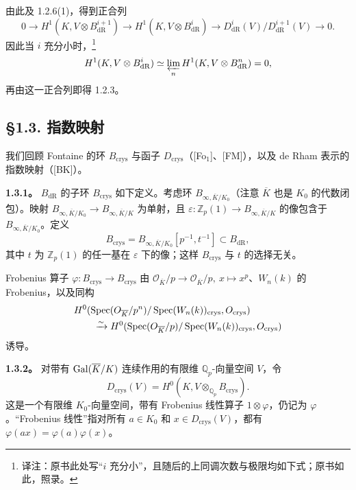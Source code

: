 由此及 1.2.6(1)，得到正合列
\[
 0\longrightarrow H^1(K,V\otimes B^{i+1}_{\mathrm{dR}})
 \longrightarrow H^1(K,V\otimes B^i_{\mathrm{dR}})
 \longrightarrow D^i_{\mathrm{dR}}(V)/D^{i+1}_{\mathrm{dR}}(V)\longrightarrow0.
\]
因此当 $i$ 充分小时，\footnote{译注：原书此处写“$i$ 充分小”，且随后的上同调次数与极限均如下式；原书如此，照录。}
\[
 H^1(K,V\otimes B^i_{\mathrm{dR}})\simeq\varprojlim_n H^1(K,V\otimes B^n_{\mathrm{dR}})=0,
\]
再由这一正合列即得 1.2.3。

\subsection*{§1.3. 指数映射}
我们回顾 Fontaine 的环 $B_{\mathrm{crys}}$ 与函子 $D_{\mathrm{crys}}$（[Fo$_1$]、[FM]），以及 de Rham 表示的指数映射（[BK]）。

\textbf{1.3.1。} $B_{\mathrm{dR}}$ 的子环 $B_{\mathrm{crys}}$ 如下定义。考虑环 $B_{\infty,\overline K/K_0}$（注意 $\overline K$ 也是 $K_0$ 的代数闭包）。映射
$B_{\infty,\overline K/K_0}\longrightarrow B_{\infty,\overline K/K}$ 为单射，且 $\varepsilon:\mathbb Z_p(1)\longrightarrow B_{\infty,\overline K/K}$ 的像包含于 $B_{\infty,\overline K/K_0}$。定义
\[
 B_{\mathrm{crys}}=B_{\infty,\overline K/K_0}[p^{-1},t^{-1}]\subset B_{\mathrm{dR}},
\]
其中 $t$ 为 $\mathbb Z_p(1)$ 的任一基在 $\varepsilon$ 下的像；这样 $B_{\mathrm{crys}}$ 与 $t$ 的选择无关。

Frobenius 算子 $\varphi:B_{\mathrm{crys}}\longrightarrow B_{\mathrm{crys}}$ 由
$\mathcal O_{\overline K}/p\longrightarrow\mathcal O_{\overline K}/p,\ x\mapsto x^p$、$W_n(k)$ 的 Frobenius，以及同构
\begin{align*}
 &H^0(\operatorname{Spec}(O_{\overline K}/p^n)/\operatorname{Spec}(W_n(k))_{\mathrm{crys}},O_{\mathrm{crys}})\\
 &\qquad\xrightarrow{\sim}H^0(\operatorname{Spec}(O_{\overline K}/p)/\operatorname{Spec}(W_n(k))_{\mathrm{crys}},O_{\mathrm{crys}})
\end{align*}
诱导。

\textbf{1.3.2。} 对带有 $\operatorname{Gal}(\overline K/K)$ 连续作用的有限维 $\mathbb Q_p$-向量空间 $V$，令
\[
 D_{\mathrm{crys}}(V)=H^0(K,V\otimes_{\mathbb Q_p}B_{\mathrm{crys}}).
\]
这是一个有限维 $K_0$-向量空间，带有 Frobenius 线性算子 $1\otimes\varphi$，仍记为 $\varphi$。“Frobenius 线性”指对所有 $a\in K_0$ 和 $x\in D_{\mathrm{crys}}(V)$，都有 $\varphi(ax)=\varphi(a)\varphi(x)$。

